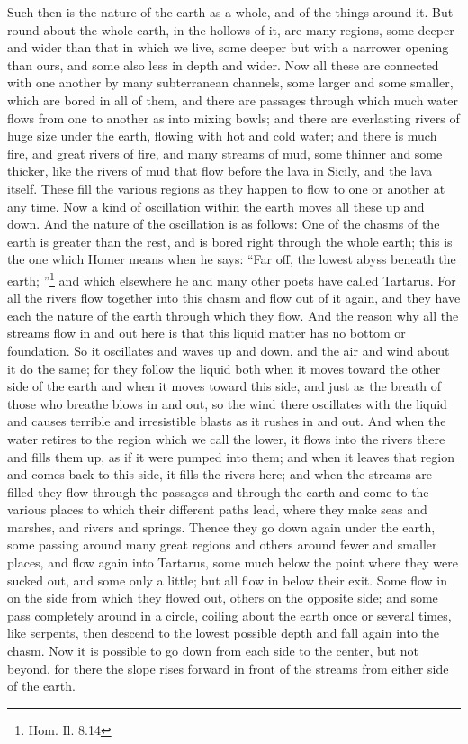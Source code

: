 \documentclass[letterpaper,12pt]{article}
\newcommand{\stephpag}[1]{\marginnote{\small\itshape\fontfamily{ppl}\selectfont #1}}
\begin{document}
\begin{drama}
Such then is the nature of the earth as a whole, and of the things around it. But round about the whole earth, in the hollows of it, are many regions, some deeper and wider than that in which we live, \stephpag{d} some deeper but with a narrower opening than ours, and some also less in depth and wider. Now all these are connected with one another by many subterranean channels, some larger and some smaller, which are bored in all of them, and there are passages through which much water flows from one to another as into mixing bowls; and there are everlasting rivers of huge size under the earth, flowing with hot and cold water; and there is much fire, and great rivers of fire, and many streams of mud, some thinner \stephpag{e} and some thicker, like the rivers of mud that flow before the lava in Sicily, and the lava itself. These fill the various regions as they happen to flow to one or another at any time. Now a kind of oscillation within the earth moves all these up and down. And the nature of the oscillation is as follows: One of the chasms of the earth is greater than the rest, \stephpag{112 a} and is bored right through the whole earth; this is the one which Homer means when he says: ``Far off, the lowest abyss beneath the earth;
''\footnote{Hom. Il. 8.14} and which elsewhere he and many other poets have called Tartarus. For all the rivers flow together into this chasm and flow out of it again, and they have each the nature of the earth through which they flow. And the reason why all the streams flow in and out here \stephpag{b} is that this liquid matter has no bottom or foundation. So it oscillates and waves up and down, and the air and wind about it do the same; for they follow the liquid both when it moves toward the other side of the earth and when it moves toward this side, and just as the breath of those who breathe blows in and out, so the wind there oscillates with the liquid and causes terrible and irresistible blasts as it rushes in and out. \stephpag{c} And when the water retires to the region which we call the lower, it flows into the rivers there and fills them up, as if it were pumped into them; and when it leaves that region and comes back to this side, it fills the rivers here; and when the streams are filled they flow through the passages and through the earth and come to the various places to which their different paths lead, where they make seas and marshes, and rivers and springs. Thence they go down again under the earth, \stephpag{d} some passing around many great regions and others around fewer and smaller places, and flow again into Tartarus, some much below the point where they were sucked out, and some only a little; but all flow in below their exit. Some flow in on the side from which they flowed out, others on the opposite side; and some pass completely around in a circle, coiling about the earth once or several times, like serpents, then descend to the lowest possible depth and fall again into the chasm. \stephpag{e} Now it is possible to go down from each side to the center, but not beyond, for there the slope rises forward in front of the streams from either side of the earth.
 

\end{drama}
\end{document}
